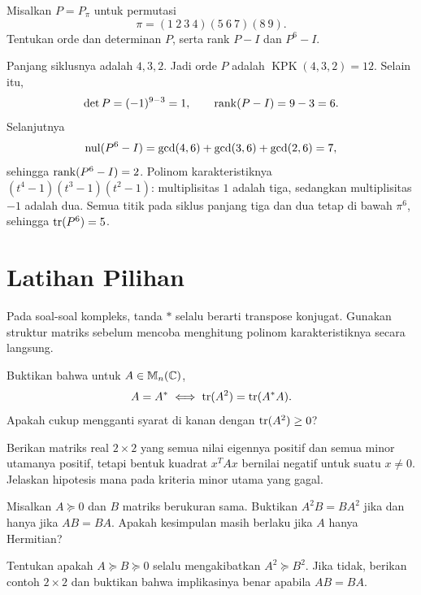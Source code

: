 \begin{exam}
    Misalkan $P=P_\pi$ untuk permutasi
    \[
        \pi=(1\ 2\ 3\ 4)(5\ 6\ 7)(8\ 9).
    \]
    Tentukan orde dan determinan $P$, serta rank $P-I$ dan $P^6-I$.
\end{exam}
\begin{solution}
    Panjang siklusnya adalah $4,3,2$. Jadi orde $P$ adalah
    $\operatorname{KPK}(4,3,2)=12$. Selain itu,
    \[
        \det P=(-1)^{9-3}=1,\qquad \operatorname{rank}(P-I)=9-3=6.
    \]
    Selanjutnya
    \[
        \operatorname{nul}(P^6-I)=\gcd(4,6)+\gcd(3,6)+\gcd(2,6)=7,
    \]
    sehingga $\operatorname{rank}(P^6-I)=2$.
    Polinom karakteristiknya $(t^4-1)(t^3-1)(t^2-1)$:
    multiplisitas $1$ adalah tiga, sedangkan multiplisitas $-1$
    adalah dua. Semua titik pada siklus panjang tiga dan dua
    tetap di bawah $\pi^6$, sehingga $\operatorname{tr}(P^6)=5$.
\end{solution}

\section{Latihan Pilihan}
\label{khusus:latihan}

Pada soal-soal kompleks, tanda $*$ selalu berarti transpose
konjugat. Gunakan struktur matriks sebelum mencoba menghitung
polinom karakteristiknya secara langsung.

\begin{latihan}\label{khusus:lat-trace-hermitian}
    Buktikan bahwa untuk $A\in\mathbb{M}_n(\mathbb{C})$,
    \[
        A=A^*\iff\operatorname{tr}(A^2)=\operatorname{tr}(A^*A).
    \]
    Apakah cukup mengganti syarat di kanan dengan
    $\operatorname{tr}(A^2)\ge0$?
\end{latihan}

\begin{latihan}\label{khusus:lat-nonhermitian}
    Berikan matriks real $2\times2$ yang semua nilai eigennya
    positif dan semua minor utamanya positif, tetapi bentuk
    kuadrat $x^TAx$ bernilai negatif untuk suatu $x\ne0$.
    Jelaskan hipotesis mana pada kriteria minor utama yang gagal.
\end{latihan}

\begin{latihan}\label{khusus:lat-komutan-kuadrat}
    Misalkan $A\succeq0$ dan $B$ matriks berukuran sama.
    Buktikan $A^2B=BA^2$ jika dan hanya jika $AB=BA$.
    Apakah kesimpulan masih berlaku jika $A$ hanya Hermitian?
\end{latihan}

\begin{latihan}\label{khusus:lat-order-kuadrat}
    Tentukan apakah $A\succeq B\succeq0$ selalu mengakibatkan
    $A^2\succeq B^2$. Jika tidak, berikan contoh $2\times2$ dan
    buktikan bahwa implikasinya benar apabila $AB=BA$.
\end{latihan}

